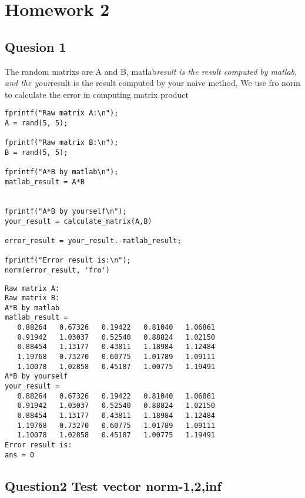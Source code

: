 \documentclass[10pt]{article}
\begin{document}
{\Huge\section*{Homework 2}}

\tableofcontents
\vspace*{4em}



{}
\subsection*{Quesion 1}



The random matrixs are A and B, matlab\textit{result is the result computed by matlab, and the your}result is the result computed by your naive method,
We use fro norm to calculate the error in computing matrix product

\begin{lstlisting}
fprintf("Raw matrix A:\n");
A = rand(5, 5);

fprintf("Raw matrix B:\n");
B = rand(5, 5);

fprintf("A*B by matlab\n");
matlab_result = A*B


fprintf("A*B by yourself\n");
your_result = calculate_matrix(A,B)

error_result = your_result.-matlab_result;

fprintf("Error result is:\n");
norm(error_result, 'fro')
\end{lstlisting}
\begin{lstlisting}[language={},xleftmargin=5pt,frame=none]
Raw matrix A:
Raw matrix B:
A*B by matlab
matlab_result =
   0.88264   0.67326   0.19422   0.81040   1.06861
   0.91942   1.03037   0.52540   0.88824   1.02150
   0.88454   1.13177   0.43811   1.18984   1.12484
   1.19768   0.73270   0.60775   1.01789   1.09111
   1.10078   1.02858   0.45187   1.00775   1.19491
A*B by yourself
your_result =
   0.88264   0.67326   0.19422   0.81040   1.06861
   0.91942   1.03037   0.52540   0.88824   1.02150
   0.88454   1.13177   0.43811   1.18984   1.12484
   1.19768   0.73270   0.60775   1.01789   1.09111
   1.10078   1.02858   0.45187   1.00775   1.19491
Error result is:
ans = 0

\end{lstlisting}


{}
\subsection*{Question2 Test vector norm-1,2,inf}
\end{document}
